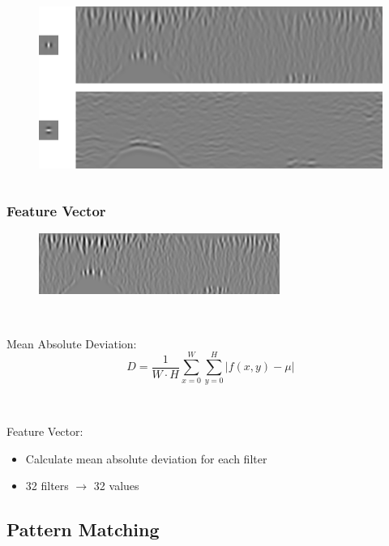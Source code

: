 \documentclass{beamer}
\begin{document}
\begin{frame}
\begin{columns}
\begin{column}{0.5\textwidth}
\begin{figure}[t]
                \label{fig:filter_bank}
            \end{figure}
            \begin{figure}[t]
                \centering
              \includegraphics[width=\textwidth]{../report/iris/pattern_gen.png}
                \label{fig:filter_bank}
            \end{figure}
        \end{column}
    \end{columns}
\end{frame}

\begin{frame}
    [fragile] \frametitle{Feature Vector}
    \begin{figure}
        [t] \centering
        \includegraphics[width=0.7\textwidth]{gabor/iris_wave.png} \label{fig:gabor}
    \end{figure}

\

    Mean Absolute Deviation:
    \[
        D = \frac{1}{W\cdot H} \sum \limits_{x=0}^W \sum \limits_{y=0}^H |f(x,y) - \mu|
    \]

\

    Feature Vector:
    \begin{itemize}
        \item Calculate mean absolute deviation for each filter
        \item 32 filters $\rightarrow$ 32 values
    \end{itemize}
\end{frame}

\subsection{Pattern Matching}
\end{document}
